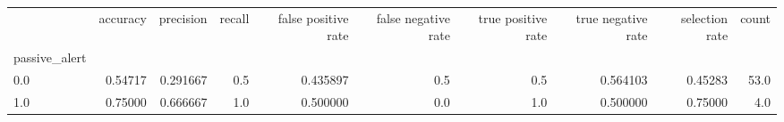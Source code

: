 \begin{tabular}{lrrrrrrrrr}
\toprule
{} &  accuracy &  precision &  recall &  false positive rate &  false negative rate &  true positive rate &  true negative rate &  selection rate &  count \\
passive\_alert &           &            &         &                      &                      &                     &                     &                 &        \\
\midrule
0.0           &   0.54717 &   0.291667 &     0.5 &             0.435897 &                  0.5 &                 0.5 &            0.564103 &         0.45283 &   53.0 \\
1.0           &   0.75000 &   0.666667 &     1.0 &             0.500000 &                  0.0 &                 1.0 &            0.500000 &         0.75000 &    4.0 \\
\bottomrule
\end{tabular}
